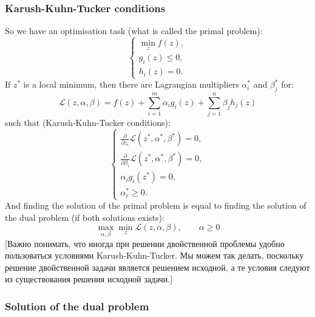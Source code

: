 \subsubsection*{Karush-Kuhn-Tucker conditions}

So we have an optimisation task (what is called the primal problem):
$$\begin{cases}
	\min\limits_{z}f(z), \\
	g_i(z)\le0, \\
	h_i(z)=0.
\end{cases}$$
If $z^*$ is a local minimum, then there are Lagrangian multipliers $\alpha_i^*$ and $\beta_j^*$ for:
$$\mathcal{L}(z,\alpha,\beta)=f(z)+\sum\limits_{i=1}^{m}\alpha_i g_i(z)+\sum\limits_{j=1}^{n}\beta_jh_j(z)$$
such that (Karush-Kuhn-Tucker conditions):
$$\begin{cases}
	\frac{\partial}{\partial z_i}\mathcal{L}(z^*,\alpha^*,\beta^*)=0, \\
	\frac{\partial}{\partial \beta_i}\mathcal{L}(z^*,\alpha^*,\beta^*)=0, \\
	\alpha_i g_i(z^*)=0, \\
	\alpha_i^*\ge0.
\end{cases}$$
And finding the solution of the primal problem is equal to finding the solution of the dual problem (if both solutions exists):
$$\max\limits_{\alpha,\beta}\min\limits_{z}\mathcal{L}(z,\alpha,\beta),\qquad\alpha\ge0$$
[Важно понимать, что иногда при решении двойственной проблемы удобно пользоваться условиями Karush-Kuhn-Tucker. Мы можем так делать, поскольку решение двойственной задачи является решением исходной, а те условия следуют из существования решения исходной задачи.]

\subsubsection*{Solution of the dual problem}

